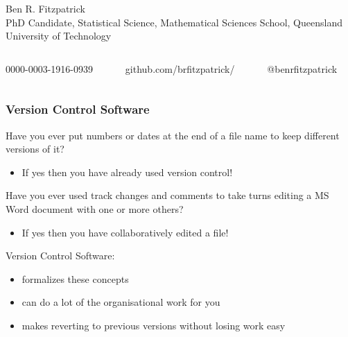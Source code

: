 \documentclass[xcolor=dvipsnames]{beamer}
\begin{document}
\begin{frame}
\begin{figure}
\begin{columns}
\end{columns}
\end{figure}

\small Ben R. Fitzpatrick\\
\tiny PhD Candidate, Statistical Science, Mathematical Sciences School, Queensland University of Technology
\newline
\begin{columns}
\begin{column}{3cm}
\tiny 0000-0003-1916-0939
\end{column}
\begin{column}{3cm}
\tiny github.com/brfitzpatrick/
\end{column}
\begin{column}{3cm}
\tiny @benrfitzpatrick
\end{column}
\end{columns}
\end{frame}

\begin{frame}
\frametitle{Version Control Software}
Have you ever put numbers or dates at the end of a file name to keep different versions of it? 
\begin{itemize} 
\item If yes then you have already used version control!
\newline
\newline
\end{itemize}

Have you ever used track changes and comments to take turns editing a  MS Word document with one or more others?
\begin{itemize}
\item If yes then you have collaboratively edited a file!
\newline
\newline
\end{itemize}

Version Control Software: 
\begin{itemize} 
\item formalizes these concepts
\item can do a lot of the organisational work for you
\item makes reverting to previous versions without losing work easy 
\end{itemize}
 
\end{frame}
\end{document}
